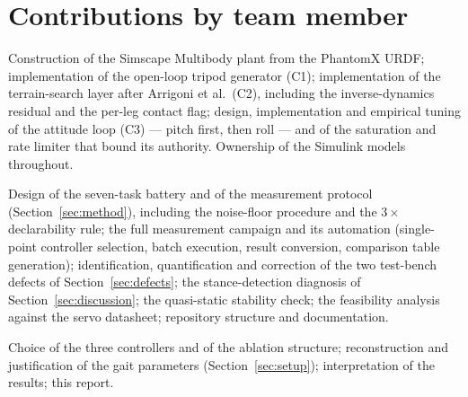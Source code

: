 \documentclass[11pt,a4paper]{article}
\newcommand{\Co}{\textsf{C1}}
\newcommand{\Ct}{\textsf{C2}}
\newcommand{\Cth}{\textsf{C3}}
\begin{document}
\section{Contributions by team member}
\label{sec:contributions}

\noindent{}

\vspace{6pt}

\begin{description}[style=unboxed,leftmargin=0pt,font=\normalfont\bfseries]

\item[Student 1 --- plant and controllers.]
Construction of the Simscape Multibody plant from the PhantomX URDF;
implementation of the open-loop tripod generator (\Co); implementation of the
terrain-search layer after Arrigoni et al.\ (\Ct), including the
inverse-dynamics residual and the per-leg contact flag; design,
implementation and empirical tuning of the attitude loop (\Cth) --- pitch
first, then roll --- and of the saturation and rate limiter that bound its
authority. Ownership of the Simulink models throughout.

\item[Student 2 --- measurement, diagnosis and analysis.]
Design of the seven-task battery and of the measurement protocol
(Section~\ref{sec:method}), including the noise-floor procedure and the
$3\times$ declarability rule; the full measurement campaign and its automation
(single-point controller selection, batch execution, result conversion,
comparison table generation); identification, quantification and correction of
the two test-bench defects of Section~\ref{sec:defects}; the stance-detection
diagnosis of Section~\ref{sec:discussion}; the quasi-static stability check;
the feasibility analysis against the servo datasheet; repository structure and
documentation.

\item[Joint.]
Choice of the three controllers and of the ablation structure; reconstruction
and justification of the gait parameters (Section~\ref{sec:setup});
interpretation of the results; this report.

\end{description}
\end{document}
